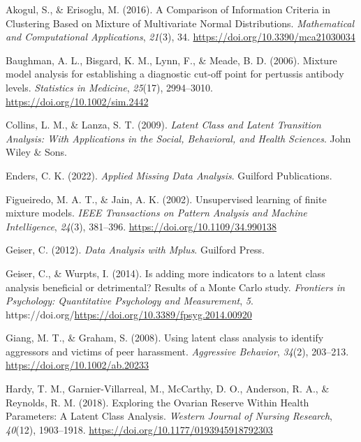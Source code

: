 \documentclass[
  ,man,floatsintext]{apa6}
\newlength{\cslhangindent}
\newlength{\cslentryspacingunit} %
\newenvironment{CSLReferences}[2] %
 {%
  \setlength{\parindent}{0pt}
  \ifodd #1
  \let\oldpar\par
  \def\par{\hangindent=\cslhangindent\oldpar}
  \fi
  \setlength{\parskip}{#2\cslentryspacingunit}
 }%
 {}
\begin{document}
\hypertarget{refs}{}
\begin{CSLReferences}{1}{0}
\leavevmode{}%
Akogul, S., \& Erisoglu, M. (2016). A {Comparison} of {Information} {Criteria} in {Clustering} {Based} on {Mixture} of {Multivariate} {Normal} {Distributions}. \emph{Mathematical and Computational Applications}, \emph{21}(3), 34. \url{https://doi.org/10.3390/mca21030034}

\leavevmode{}%
Baughman, A. L., Bisgard, K. M., Lynn, F., \& Meade, B. D. (2006). Mixture model analysis for establishing a diagnostic cut-off point for pertussis antibody levels. \emph{Statistics in Medicine}, \emph{25}(17), 2994--3010. \url{https://doi.org/10.1002/sim.2442}

\leavevmode{}%
Collins, L. M., \& Lanza, S. T. (2009). \emph{Latent {Class} and {Latent} {Transition} {Analysis}: {With} {Applications} in the {Social}, {Behavioral}, and {Health} {Sciences}}. John Wiley \& Sons.

\leavevmode{}%
Enders, C. K. (2022). \emph{Applied {Missing} {Data} {Analysis}}. Guilford Publications.

\leavevmode{}%
Figueiredo, M. A. T., \& Jain, A. K. (2002). Unsupervised learning of finite mixture models. \emph{IEEE Transactions on Pattern Analysis and Machine Intelligence}, \emph{24}(3), 381--396. \url{https://doi.org/10.1109/34.990138}

\leavevmode{}%
Geiser, C. (2012). \emph{Data {Analysis} with {Mplus}}. Guilford Press.

\leavevmode{}%
Geiser, C., \& Wurpts, I. (2014). Is adding more indicators to a latent class analysis beneficial or detrimental? {Results} of a {Monte} {Carlo} study. \emph{Frontiers in Psychology: Quantitative Psychology and Measurement}, \emph{5}. https://doi.org/\url{https://doi.org/10.3389/fpsyg.2014.00920}

\leavevmode{}%
Giang, M. T., \& Graham, S. (2008). Using latent class analysis to identify aggressors and victims of peer harassment. \emph{Aggressive Behavior}, \emph{34}(2), 203--213. \url{https://doi.org/10.1002/ab.20233}

\leavevmode{}%
Hardy, T. M., Garnier-Villarreal, M., McCarthy, D. O., Anderson, R. A., \& Reynolds, R. M. (2018). Exploring the {Ovarian} {Reserve} {Within} {Health} {Parameters}: {A} {Latent} {Class} {Analysis}. \emph{Western Journal of Nursing Research}, \emph{40}(12), 1903--1918. \url{https://doi.org/10.1177/0193945918792303}


\end{CSLReferences}
\end{document}
